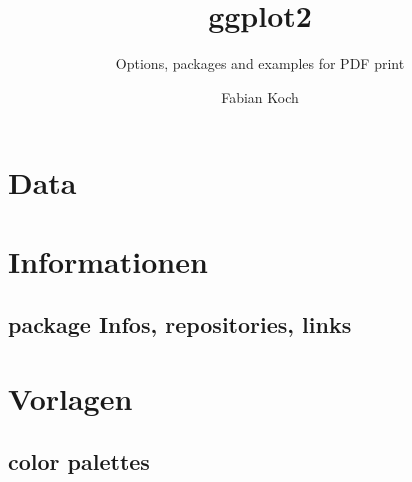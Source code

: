 \documentclass[
]{article}
\title{ggplot2}
\subtitle{Options, packages and examples for PDF print}
\author{Fabian Koch}
\date{}
\begin{document}
\maketitle

\newpage 
\tableofcontents

\newpage

\hypertarget{data}{%
\section{Data}\label{data}}

\newpage

\hypertarget{informationen}{%
\section{Informationen}\label{informationen}}

\hypertarget{package-infos-repositories-links}{%
\subsection{package Infos, repositories,
links}\label{package-infos-repositories-links}}

\hypertarget{vorlagen}{%
\section{Vorlagen}\label{vorlagen}}

\hypertarget{color-palettes}{%
\subsection{color palettes}\label{color-palettes}}
\end{document}
